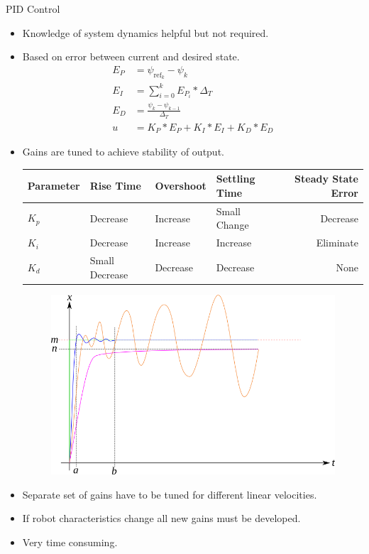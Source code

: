 \documentclass[hyperref={pdfpagelabels=false}]{beamer}
\begin{document}
\begin{frame}[allowframebreaks]{PID Control}
\begin{itemize}
\item Knowledge of system dynamics helpful but not required.
\item Based on error between current and desired state.
\begin{align*}
E_P &= \psi_{\text{ref}_k} - \psi_k \\
E_I &= \sum_{i=0}^{k}E_{P_i}*\Delta_T \\
E_D &= \frac{\psi_k - \psi_{k-1}}{\Delta_T} \\
u &= K_P*E_P + K_I*E_I + K_D*E_D
\end{align*}
\item Gains are tuned to achieve stability of output.

\begin{table}[ht!]
\tiny
\centering
\begin{tabular}{@{}llllr@{}} \toprule
Parameter    & Rise Time      & Overshoot & Settling Time & Steady State Error \\ \midrule
$K_p$        & Decrease       & Increase  & Small Change  & Decrease \\
$K_i$        & Decrease       & Increase  & Increase      & Eliminate \\
$K_d$        & Small Decrease & Decrease  & Decrease      & None \\ \bottomrule
\end{tabular}
\end{table}

\begin{figure}[ht!]
	\centering
	\includegraphics[width=.7\textwidth]{images/pid}
\end{figure}

\item Separate set of gains have to be tuned for different linear velocities.
\item If robot characteristics change all new gains must be developed.
\item Very time consuming.
\end{itemize}
\end{frame}
\end{document}
